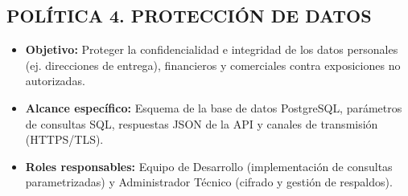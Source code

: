 \documentclass[12pt,letterpaper]{article}
\begin{document}
\subsection{POLÍTICA 4. PROTECCIÓN DE DATOS}

\begin{itemize}
    \item \textbf{Objetivo:} Proteger la confidencialidad e integridad de los datos personales (ej. direcciones de entrega), financieros y comerciales contra exposiciones no autorizadas.
    \item \textbf{Alcance específico:} Esquema de la base de datos PostgreSQL, parámetros de consultas SQL, respuestas JSON de la API y canales de transmisión (HTTPS/TLS).
    \item \textbf{Roles responsables:} Equipo de Desarrollo (implementación de consultas parametrizadas) y Administrador Técnico (cifrado y gestión de respaldos).
\end{itemize}
\end{document}
